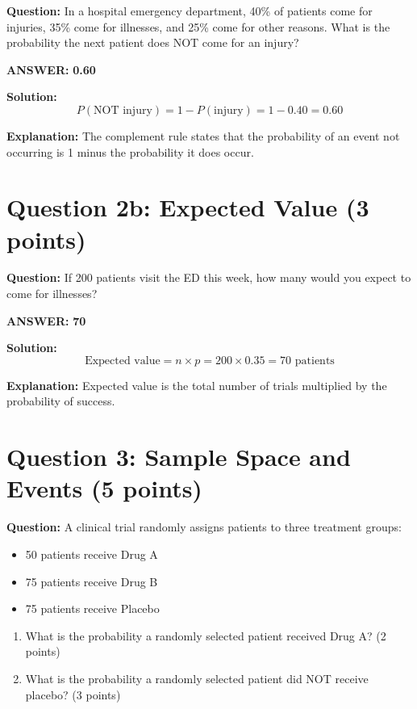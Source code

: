 \documentclass[11pt]{article}
\begin{document}
\textbf{Question:} In a hospital emergency department, 40\% of patients come for injuries, 35\% come for illnesses, and 25\% come for other reasons. What is the probability the next patient does NOT come for an injury?

\textbf{ANSWER:} \textbf{0.60}

\textbf{Solution:}
\[P(\text{NOT injury}) = 1 - P(\text{injury}) = 1 - 0.40 = 0.60\]

\textbf{Explanation:} The complement rule states that the probability of an event not occurring is 1 minus the probability it does occur.

\vspace{0.3cm}
\noindent\hrulefill

\section*{Question 2b: Expected Value (3 points)}

\textbf{Question:} If 200 patients visit the ED this week, how many would you expect to come for illnesses?

\textbf{ANSWER:} \textbf{70}

\textbf{Solution:}
\[\text{Expected value} = n \times p = 200 \times 0.35 = 70 \text{ patients}\]

\textbf{Explanation:} Expected value is the total number of trials multiplied by the probability of success.

\vspace{0.3cm}
\noindent\hrulefill

\section*{Question 3: Sample Space and Events (5 points)}

\textbf{Question:} A clinical trial randomly assigns patients to three treatment groups:
\begin{itemize}
    \item 50 patients receive Drug A
    \item 75 patients receive Drug B
    \item 75 patients receive Placebo
\end{itemize}

\begin{enumerate}
    \item[a)] What is the probability a randomly selected patient received Drug A? (2 points)
    \item[b)] What is the probability a randomly selected patient did NOT receive placebo? (3 points)
\end{enumerate}
\end{document}
